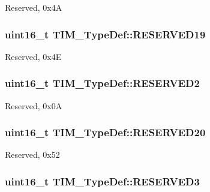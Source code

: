 Reserved, 0x4\-A \hypertarget{struct_t_i_m___type_def_a58477bdaaf8fcbcd9c8411729daaf535}{
\subsubsection[{R\-E\-S\-E\-R\-V\-E\-D19}]{\setlength{\rightskip}{0pt plus 5cm}uint16\-\_\-t T\-I\-M\-\_\-\-Type\-Def\-::\-R\-E\-S\-E\-R\-V\-E\-D19}}\label{struct_t_i_m___type_def_a58477bdaaf8fcbcd9c8411729daaf535}
Reserved, 0x4\-E \hypertarget{struct_t_i_m___type_def_af62f86f55f2a387518f3de10d916eb7c}{
\subsubsection[{R\-E\-S\-E\-R\-V\-E\-D2}]{\setlength{\rightskip}{0pt plus 5cm}uint16\-\_\-t T\-I\-M\-\_\-\-Type\-Def\-::\-R\-E\-S\-E\-R\-V\-E\-D2}}\label{struct_t_i_m___type_def_af62f86f55f2a387518f3de10d916eb7c}
Reserved, 0x0\-A \hypertarget{struct_t_i_m___type_def_aebe8039568a704dc6193fe0aaa795813}{
\subsubsection[{R\-E\-S\-E\-R\-V\-E\-D20}]{\setlength{\rightskip}{0pt plus 5cm}uint16\-\_\-t T\-I\-M\-\_\-\-Type\-Def\-::\-R\-E\-S\-E\-R\-V\-E\-D20}}\label{struct_t_i_m___type_def_aebe8039568a704dc6193fe0aaa795813}
Reserved, 0x52 \hypertarget{struct_t_i_m___type_def_a8f952613a22049f3ea2b50b7e0d10472}{
\subsubsection[{R\-E\-S\-E\-R\-V\-E\-D3}]{\setlength{\rightskip}{0pt plus 5cm}uint16\-\_\-t T\-I\-M\-\_\-\-Type\-Def\-::\-R\-E\-S\-E\-R\-V\-E\-D3}}\label{struct_t_i_m___type_def_a8f952613a22049f3ea2b50b7e0d10472}
